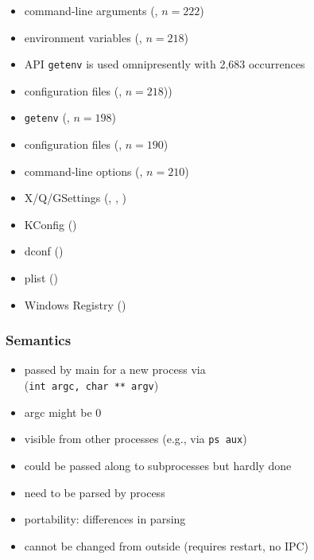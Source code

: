 \begin{frame}
	\methodQuestion{} 
	\begin{itemize}
	\item command-line arguments (, $n=222$)
	\item environment variables (, $n=218$)
	\item \methodSource{} API \texttt{getenv} is used omnipresently with 2,683 occurrences
	\item configuration files (, $n=218$))
	\end{itemize}
\end{frame}


\begin{frame}
	\methodQuestion{} 
	\begin{itemize}
	\item \texttt{getenv} (, $n=198$)
	\item configuration files (, $n=190$)
	\item command-line options (, $n=210$)
	\item X/Q/GSettings (, , )
	\item KConfig ()
	\item dconf ()
	\item plist ()
	\item Windows Registry ()
	\end{itemize}
\end{frame}


\begin{frame}
	\frametitle{Semantics}
	\begin{itemize}
	\item passed by main for a new process via \\ (\texttt{int argc, char ** argv})
	\item argc might be 0
	\item visible from other processes (e.g., via \texttt{ps aux})
	\item could be passed along to subprocesses but hardly done
	\item need to be parsed by process
	\item portability: differences in parsing
	\item cannot be changed from outside (requires restart, no IPC)
	\end{itemize}
\end{frame}




